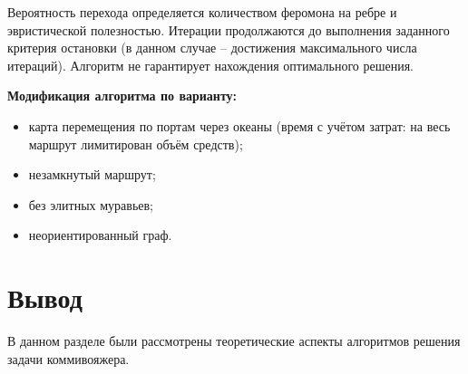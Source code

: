 Вероятность перехода определяется количеством феромона на ребре и эвристической полезностью.
Итерации продолжаются до выполнения заданного критерия остановки (в данном случае -- достижения максимального числа итераций).
Алгоритм не гарантирует нахождения оптимального решения.

\textbf{Модификация алгоритма по варианту:}
\begin{itemize}
    \item карта перемещения по портам через океаны (время с учётом затрат: на весь маршрут лимитирован объём средств);
    \item незамкнутый маршрут;
    \item без элитных муравьев;
    \item неориентированный граф.
\end{itemize}

\section*{Вывод}

В данном разделе были рассмотрены теоретические аспекты алгоритмов решения задачи коммивояжера.

